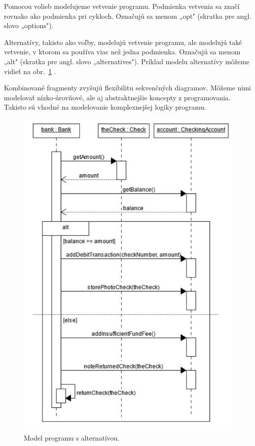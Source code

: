 \documentclass[10pt,slovak,a4paper]{article}
\begin{document}
\noindent Pomocou volieb modelujeme vetvenie programu. Podmienka vetvenia sa značí rovnako ako podmienka pri cykloch. 
Označujú sa menom „opt" (skratka pre angl. slovo „options"). \cite{booch00} \newline

\noindent Alternatívy, takisto ako voľby, modelujú vetvenie programu, ale modelujú také vetvenie, v ktorom sa používa viac než jedna podmienka. 
Označujú sa menom „alt" (skratka pre angl. slovo „alternatives"). 
Príklad modelu alternatívy môžeme vidieť na obr.~\ref{diag2} . \cite{booch00} \newline

\noindent Kombinované fragmenty zvyšujú flexibilitu sekvenčných diagramov. Môžeme nimi modelovať nízko-úrovňové, ale aj abstraktnejšie koncepty z programovania. 
Takisto sú vhodné na modelovanie komplexnejšej logiky programu.  

\begin{figure}[tbh]
\centering
\includegraphics[scale=0.8]{cond_diag.pdf}
\caption{Model programu s alternatívou. \cite{booch00}}
\label{diag2}
\end{figure}
\end{document}
